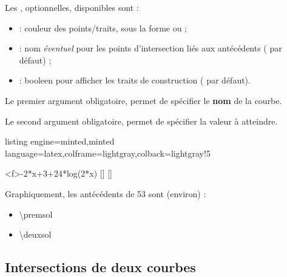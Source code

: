 \documentclass[11pt,a4paper]{ltxdoc}
\begin{document}
Les \MontreCode{[clés]}, optionnelles, disponibles sont :

\smallskip

\begin{itemize}
	\item {} : couleur des points/traits, sous la forme  ou  ;
	\item {} : nom \textit{éventuel} pour les points d'intersection liés aux antécédents ( par défaut) ;
	\item {} : booleen pour afficher les traits de construction ( par défaut).
\end{itemize}

\smallskip

Le premier argument obligatoire, permet de spécifier le \textbf{nom} de la courbe.

\smallskip

Le second argument obligatoire, permet de spécifier la valeur à atteindre.

\begin{tcblisting}{listing engine=minted,minted language=latex,colframe=lightgray,colback=lightgray!5}
\begin{GraphiqueTikz}%
	[x=0.9cm,y=0.425cm,Xmin=4,Xmax=20,Origx=4,
	Ymin=40,Ymax=56,Ygrille=2,Ygrilles=1,Origy=40]
	{-2*x+3+24*log(2*x)}
	[\premsol]
	[\deuxsol]
\end{GraphiqueTikz}

Graphiquement, les antécédents de 53 sont (environ) :

\begin{itemize}
	\item \num{\premsol}
	\item \num{\deuxsol}
\end{itemize}
\end{tcblisting}

\pagebreak

\subsection{Intersections de deux courbes}\label{intersect}
\end{document}
